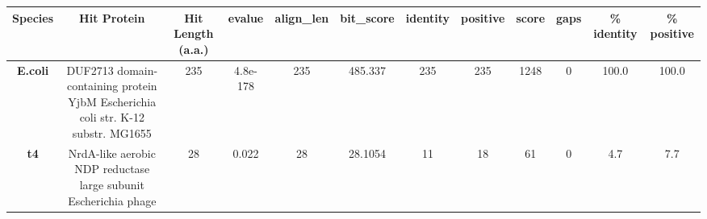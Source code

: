 \begin{tabular}{|c|c|c|c|c|c|c|c|c|c|c|c|} \hline
\textbf{Species} & \textbf{Hit Protein} & \textbf{Hit Length (a.a.)} & \textbf{evalue} & \textbf{align\_len} & \textbf{bit\_score} & \textbf{identity} & \textbf{positive} & \textbf{score} & \textbf{gaps} & \textbf{\% identity} & \textbf{\% positive} \\ \hline
\textbf{E.coli} & DUF2713 domain-containing protein YjbM Escherichia coli str. K-12 substr. MG1655 & 235 & 4.8e-178 & 235 & 485.337 & 235 & 235 & 1248 & 0 & 100.0 & 100.0\\
\textbf{t4} & NrdA-like aerobic NDP reductase large subunit Escherichia phage  & 28 & 0.022 & 28 & 28.1054 & 11 & 18 & 61 & 0 & 4.7 & 7.7\\
\hline \end{tabular}
